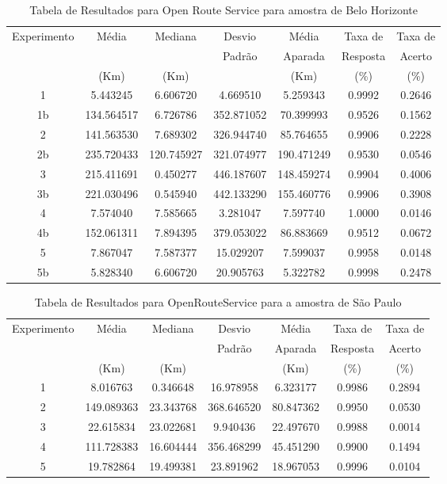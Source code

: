 \begin{anexosenv}
\begin{table}[ht]
\centering
\begin{tabular}{|c|c|c|c|c|c|c|}
\hline
Experimento & Média & Mediana & Desvio & Média & Taxa de & Taxa de \\
 & & & Padrão & Aparada & Resposta & Acerto \\
 & (Km) & (Km) & & (Km) & (\%) & (\%) \\ \hline
1 & 5.443245 & 6.606720 & 4.669510 & 5.259343 & 0.9992 & 0.2646 \\ \hline
1b & 134.564517 & 6.726786 & 352.871052 & 70.399993 & 0.9526 & 0.1562 \\ \hline
2 & 141.563530 & 7.689302 & 326.944740 & 85.764655 & 0.9906 & 0.2228 \\ \hline
2b & 235.720433 & 120.745927 & 321.074977 & 190.471249 & 0.9530 & 0.0546 \\ \hline
3 & 215.411691 & 0.450277 & 446.187607 & 148.459274 & 0.9904 & 0.4006 \\ \hline
3b & 221.030496 & 0.545940 & 442.133290 & 155.460776 & 0.9906 & 0.3908 \\ \hline
4 & 7.574040 & 7.585665 & 3.281047 & 7.597740 & 1.0000 & 0.0146 \\ \hline
4b & 152.061311 & 7.894395 & 379.053022 & 86.883669 & 0.9512 & 0.0672 \\ \hline
5 & 7.867047 & 7.587377 & 15.029207 & 7.599037 & 0.9958 & 0.0148 \\ \hline
5b & 5.828340 & 6.606720 & 20.905763 & 5.322782 & 0.9998 & 0.2478 \\ \hline
\end{tabular}
\caption{Tabela de Resultados para Open Route Service para amostra de Belo Horizonte}
\label{tab:orsBH}
\end{table}


\begin{table}[ht]
\centering
\begin{tabular}{|c|c|c|c|c|c|c|}
\hline
Experimento & Média & Mediana & Desvio & Média & Taxa de & Taxa de \\
    & & & Padrão & Aparada & Resposta & Acerto \\
    & (Km) & (Km) & & (Km) & (\%) & (\%) \\ \hline
1 & 8.016763 & 0.346648 & 16.978958 & 6.323177 & 0.9986 & 0.2894 \\ \hline
2 & 149.089363 & 23.343768 & 368.646520 & 80.847362 & 0.9950 & 0.0530 \\ \hline
3 & 22.615834 & 23.022681 & 9.940436 & 22.497670 & 0.9988 & 0.0014 \\ \hline
4 & 111.728383 & 16.604444 & 356.468299 & 45.451290 & 0.9900 & 0.1494 \\ \hline
5 & 19.782864 & 19.499381 & 23.891962 & 18.967053 & 0.9996 & 0.0104 \\ \hline
\end{tabular}
\caption{Tabela de Resultados para OpenRouteService para a amostra de São Paulo}
\label{tab:openrouteserviceSP}
\end{table}
    


\end{anexosenv}
